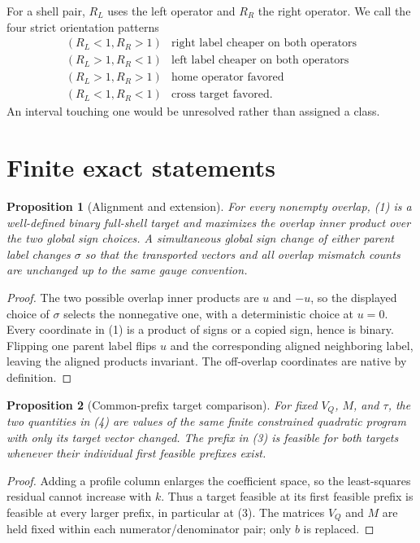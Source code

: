 \documentclass[11pt]{article}
\newtheorem{proposition}{Proposition}
\begin{document}
For a shell pair, $R_L$ uses the left operator and $R_R$ the right operator.
We call the four strict orientation patterns
\[
\begin{array}{c|c}
 (R_L<1,R_R>1)&\text{right label cheaper on both operators}\\
 (R_L>1,R_R<1)&\text{left label cheaper on both operators}\\
 (R_L>1,R_R>1)&\text{home operator favored}\\
 (R_L<1,R_R<1)&\text{cross target favored}.
\end{array}                                                   \tag{5}
\]
An interval touching one would be unresolved rather than assigned a class.

\section{Finite exact statements}

\begin{proposition}[Alignment and extension]
For every nonempty overlap, (1) is a well-defined binary full-shell target and
maximizes the overlap inner product over the two global sign choices.  A
simultaneous global sign change of either parent label changes $\sigma$ so that
the transported vectors and all overlap mismatch counts are unchanged up to
the same gauge convention.
\end{proposition}
\begin{proof}
The two possible overlap inner products are $u$ and $-u$, so the displayed
choice of $\sigma$ selects the nonnegative one, with a deterministic choice at
$u=0$.  Every coordinate in (1) is a product of signs or a copied sign, hence
is binary.  Flipping one parent label flips $u$ and the corresponding aligned
neighboring label, leaving the aligned products invariant.  The off-overlap
coordinates are native by definition.
\end{proof}

\begin{proposition}[Common-prefix target comparison]
For fixed $V_Q$, $M$, and $\tau$, the two quantities in (4) are values of the
same finite constrained quadratic program with only its target vector changed.
The prefix in (3) is feasible for both targets whenever their individual first
feasible prefixes exist.
\end{proposition}
\begin{proof}
Adding a profile column enlarges the coefficient space, so the least-squares
residual cannot increase with $k$.  Thus a target feasible at its first
feasible prefix is feasible at every larger prefix, in particular at (3).
The matrices $V_Q$ and $M$ are held fixed within each numerator/denominator
pair; only $b$ is replaced.
\end{proof}
\end{document}
